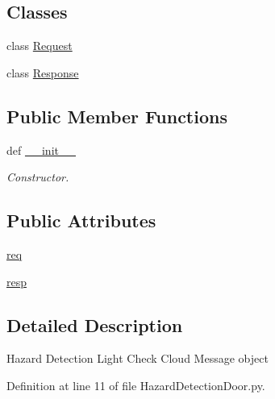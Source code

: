 \subsection*{Classes}
\begin{DoxyCompactItemize}
\item 
class \hyperlink{classRappCloud_1_1CloudMsgs_1_1HazardDetectionDoor_1_1HazardDetectionDoor_1_1Request}{Request}
\item 
class \hyperlink{classRappCloud_1_1CloudMsgs_1_1HazardDetectionDoor_1_1HazardDetectionDoor_1_1Response}{Response}
\end{DoxyCompactItemize}
\subsection*{Public Member Functions}
\begin{DoxyCompactItemize}
\item 
def \hyperlink{classRappCloud_1_1CloudMsgs_1_1HazardDetectionDoor_1_1HazardDetectionDoor_a8bbab1291fc23182f37e82babee028f4}{\-\_\-\-\_\-init\-\_\-\-\_\-}
\begin{DoxyCompactList}\small\item\em Constructor. \end{DoxyCompactList}\end{DoxyCompactItemize}
\subsection*{Public Attributes}
\begin{DoxyCompactItemize}
\item 
\hyperlink{classRappCloud_1_1CloudMsgs_1_1HazardDetectionDoor_1_1HazardDetectionDoor_a26d6d2aecaa94fe2ae22c1d373177fa7}{req}
\item 
\hyperlink{classRappCloud_1_1CloudMsgs_1_1HazardDetectionDoor_1_1HazardDetectionDoor_ab839feeefa52db8d1fbc0784fd457ac5}{resp}
\end{DoxyCompactItemize}


\subsection{Detailed Description}
\begin{DoxyVerb}Hazard Detection Light Check Cloud Message object\end{DoxyVerb}
 

Definition at line 11 of file Hazard\-Detection\-Door.\-py.



